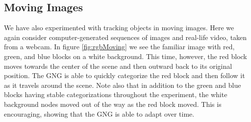 \documentclass{article}
\renewcommand{\|}{\origbar} %
\begin{document}
\subsection{Moving Images}

We have also experimented with tracking objects in moving images. Here we again consider computer-generated sequences of images and real-life video, taken from a webcam. In figure \ref{fig:rgbMoving} we see the familiar image with red, green, and blue blocks on a white background. This time, however, the red block moves towards the center of the scene and then outward back to its original position. The GNG is able to quickly categorize the red block and then follow it as it travels around the scene. Note also that in addition to the green and blue blocks having stable categorizations throughout the experiment, the white background nodes moved out of the way as the red block moved. This is encouraging, showing that the GNG is able to adapt over time.
\end{document}
